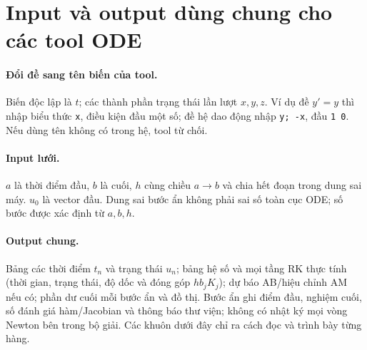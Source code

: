 \section{Input và output dùng chung cho các tool ODE}

\paragraph{Đổi đề sang tên biến của tool.} Biến độc lập là $t$; các thành phần trạng thái lần lượt $x,y,z$. Ví dụ đề $y'=y$ thì nhập biểu thức \texttt{x}, điều kiện đầu một số; đề hệ dao động nhập \texttt{y; -x}, đầu \texttt{1 0}. Nếu dùng tên không có trong hệ, tool từ chối.
\paragraph{Input lưới.} $a$ là thời điểm đầu, $b$ là cuối, $h$ cùng chiều $a\to b$ và chia hết đoạn trong dung sai máy. $u_0$ là vector đầu. Dung sai bước ẩn không phải sai số toàn cục ODE; số bước được xác định từ $a,b,h$.
\paragraph{Output chung.} Bảng các thời điểm $t_n$ và trạng thái $u_n$; bảng hệ số và mọi tầng RK thực tính (thời gian, trạng thái, độ dốc và đóng góp $hb_jK_j$); dự báo AB/hiệu chỉnh AM nếu có; phần dư cuối mỗi bước ẩn và đồ thị. Bước ẩn ghi điểm đầu, nghiệm cuối, số đánh giá hàm/Jacobian và thông báo thư viện; không có nhật ký mọi vòng Newton bên trong bộ giải. Các khuôn dưới đây chỉ ra cách đọc và trình bày từng hàng.

